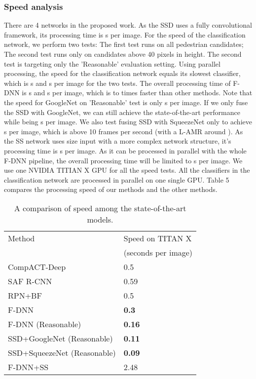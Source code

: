 \documentclass[10pt,letterpaper]{article}
\begin{document}
\subsubsection{Speed analysis}
There are 4 networks in the proposed work. As the SSD uses a fully convolutional framework, its processing time is s per image. For the speed of the classification network, we perform two tests: The first test runs on all pedestrian candidates; The second test runs only on candidates above 40 pixels in height. The second test is targeting only the 'Reasonable' evaluation setting. Using parallel processing, the speed for the classification network equals its slowest classifier, which is s and s per image for the two tests. The overall processing time of F-DNN is s and s per image, which is  to  times faster than other methods. Note that the speed for GoogleNet on 'Reasonable' test is only s per image. If we only fuse the SSD with GoogleNet, we can still achieve the state-of-the-art performance while being s per image. We also test fusing SSD with SqueezeNet \cite{SqueezeNet} only to achieve s per image, which is above 10 frames per second (with a L-AMR around ). As the SS network uses  size input with a more complex network structure, it's processing time is s per image. As it can be processed in parallel with the whole F-DNN pipeline, the overall processing time will be limited to s per image. We use one NVIDIA TITIAN X GPU for all the speed tests. All the classifiers in the classification network are processed in parallel on one single GPU. Table 5 compares the processing speed of our methods and the other methods.

\begin{table}
\begin{center}
\begin{tabular}{|l|l|}
\hline
Method & Speed on TITAN X \\
&(seconds per image)\\
\hline\hline
CompACT-Deep & 0.5\\
SAF R-CNN & 0.59\\
RPN+BF & 0.5\\
F-DNN & \textbf{0.3}\\
F-DNN (Reasonable) & \textbf{0.16} \\
SSD+GoogleNet (Reasonable) & \textbf{0.11} \\
SSD+SqueezeNet (Reasonable) & \textbf{0.09} \\
F-DNN+SS & 2.48\\
\hline
\end{tabular}
\end{center}
\caption{A comparison of speed among the state-of-the-art models.}
\end{table}
\end{document}
